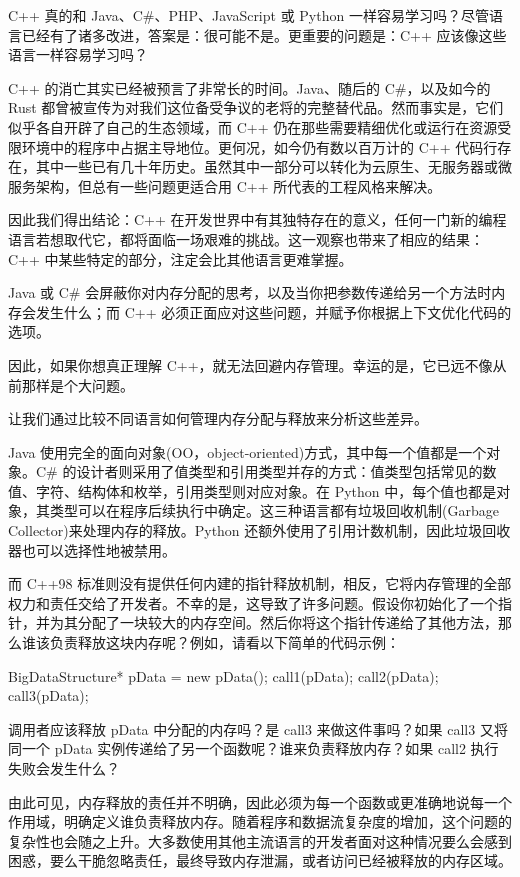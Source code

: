 C++ 真的和 Java、C\#、PHP、JavaScript 或 Python 一样容易学习吗？尽管语言已经有了诸多改进，答案是：很可能不是。更重要的问题是：C++ 应该像这些语言一样容易学习吗？

C++ 的消亡其实已经被预言了非常长的时间。Java、随后的 C\#，以及如今的 Rust 都曾被宣传为对我们这位备受争议的老将的完整替代品。然而事实是，它们似乎各自开辟了自己的生态领域，而 C++ 仍在那些需要精细优化或运行在资源受限环境中的程序中占据主导地位。更何况，如今仍有数以百万计的 C++ 代码行存在，其中一些已有几十年历史。虽然其中一部分可以转化为云原生、无服务器或微服务架构，但总有一些问题更适合用 C++ 所代表的工程风格来解决。

因此我们得出结论：C++ 在开发世界中有其独特存在的意义，任何一门新的编程语言若想取代它，都将面临一场艰难的挑战。这一观察也带来了相应的结果：C++ 中某些特定的部分，注定会比其他语言更难掌握。

Java 或 C\# 会屏蔽你对内存分配的思考，以及当你把参数传递给另一个方法时内存会发生什么；而 C++ 必须正面应对这些问题，并赋予你根据上下文优化代码的选项。

因此，如果你想真正理解 C++，就无法回避内存管理。幸运的是，它已远不像从前那样是个大问题。

让我们通过比较不同语言如何管理内存分配与释放来分析这些差异。

Java 使用完全的面向对象(OO，object-oriented)方式，其中每一个值都是一个对象。C\# 的设计者则采用了值类型和引用类型并存的方式：值类型包括常见的数值、字符、结构体和枚举，引用类型则对应对象。在 Python 中，每个值也都是对象，其类型可以在程序后续执行中确定。这三种语言都有垃圾回收机制(Garbage Collector)来处理内存的释放。Python 还额外使用了引用计数机制，因此垃圾回收器也可以选择性地被禁用。

而 C++98 标准则没有提供任何内建的指针释放机制，相反，它将内存管理的全部权力和责任交给了开发者。不幸的是，这导致了许多问题。假设你初始化了一个指针，并为其分配了一块较大的内存空间。然后你将这个指针传递给了其他方法，那么谁该负责释放这块内存呢？例如，请看以下简单的代码示例：

\begin{cpp}
BigDataStructure* pData = new pData();
call1(pData);
call2(pData);
call3(pData);
\end{cpp}

调用者应该释放 pData 中分配的内存吗？是 call3 来做这件事吗？如果 call3 又将同一个 pData 实例传递给了另一个函数呢？谁来负责释放内存？如果 call2 执行失败会发生什么？

由此可见，内存释放的责任并不明确，因此必须为每一个函数或更准确地说每一个作用域，明确定义谁负责释放内存。随着程序和数据流复杂度的增加，这个问题的复杂性也会随之上升。大多数使用其他主流语言的开发者面对这种情况要么会感到困惑，要么干脆忽略责任，最终导致内存泄漏，或者访问已经被释放的内存区域。

